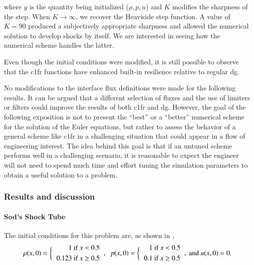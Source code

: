 where $y$ is the quantity being initialized ($\rho, p, u$) and $K$ modifies the sharpness of the step. When $K \rightarrow \infty$, we recover the Heaviside step function. A value of $K=90$ produced a subjectively appropriate sharpness and allowed the numerical solution to develop shocks by itself. We are interested in seeing how the numerical scheme handles the latter.

Even though the initial conditions were modified, it is still possible to observe that the \gls{c1fr} functions have enhanced built-in resilience relative to regular \gls{dg}.

No modifications to the interface flux definitions were made for the following results.  It can be argued that a different selection of fluxes and the use of limiters or filters could improve the results of both \gls{c1fr} and \gls{dg}. However, the goal of the following exposition is not to present the ``best'' or a ``better'' numerical scheme for the solution of the Euler equations, but rather to assess the behavior of a general scheme like \gls{c1fr} in a challenging situation that could appear in a flow of engineering interest. The idea behind this goal is that if an untuned scheme performs well in a challenging scenario, it is reasonable to expect the engineer will not need to spend much time and effort tuning the simulation parameters to obtain a useful solution to a problem.

\subsubsection{Results and discussion}
\setcounter{secnumdepth}{5}
\paragraph{Sod's Shock Tube}
\label{sec:shock_tube}
The initial conditions for this problem are, as shown in \cite{roe1981approximate},
\begin{equation*}
\rho(x,0) = \bigg\{
\begin{tabular}{c}
$
\begin{aligned}
1 &\text{ if } x < 0.5\\
0.123 &\text{ if } x \ge 0.5
\end{aligned}
$
\end{tabular},\;\;
p(x,0) = \bigg\{
\begin{tabular}{c}
$
\begin{aligned}
1 &\text{ if } x < 0.5\\
0.1 &\text{ if } x \ge 0.5
\end{aligned}
$
\end{tabular}
,\text{ and } u(x,0) = 0.
\end{equation*}

